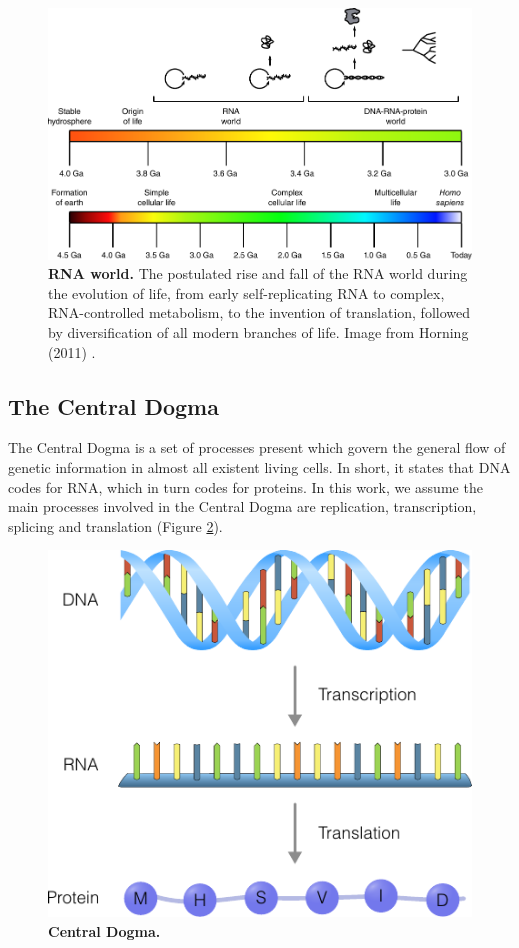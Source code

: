 
\begin{figure}[htb!]
	\centering\includegraphics[width=.5\linewidth]{fig/rnaworld} %
	\caption{
		\textbf{RNA world.} The postulated rise and fall of the RNA world during the evolution of life, from early self-replicating RNA to complex, RNA-controlled metabolism, to the invention of translation, followed by diversification of all modern branches of life. Image from Horning (2011) \cite{horning_rnaworld_2011}. %
	}
	\label{fig:rnaworld}
\end{figure}

\subsection{The Central Dogma}

The Central Dogma is a set of processes present which govern the general flow of genetic information in almost all existent living cells. In short, it states that DNA codes for RNA, which in turn codes for proteins.
In this work, we assume the main processes involved in the Central Dogma are replication, transcription, splicing and translation (Figure \ref{fig:centraldogma}). 


\begin{figure}[htb!]
	\centering\includegraphics[width=.5\linewidth]{fig/central_dogma} %
	\caption{
		\textbf{Central Dogma.} %
	}
	\label{fig:centraldogma}
\end{figure}


